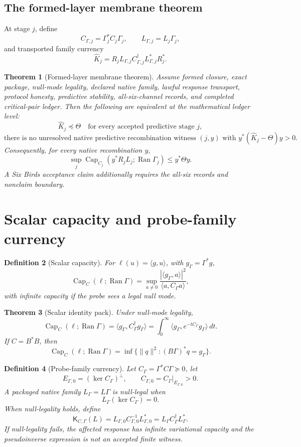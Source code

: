 \documentclass[11pt]{article}
\newtheorem{theorem}{Theorem}[section]
\newtheorem{definition}[theorem]{Definition}
\DeclareMathOperator{\range}{Ran}
\DeclareMathOperator{\Capacity}{Cap}
\newcommand{\K}{\mathsf K}
\newcommand{\Loewner}{\preceq}
\begin{document}
\subsection{The formed-layer membrane theorem}
At stage \(j\), define
\[
  C_{\Gamma,j}=\Gamma_j^*C_j\Gamma_j,
  \qquad
  L_{\Gamma,j}=L_j\Gamma_j,
\]
and transported family currency
\[
  \widehat K_j
  =R_jL_{\Gamma,j}C_{\Gamma,j}^\dagger L_{\Gamma,j}^*R_j^*.
\]

\begin{theorem}[Formed-layer membrane theorem]
Assume formed closure, exact package, null-mode legality, declared native family, lawful response transport, protocol honesty, predictive stability, all-six-channel records, and completed critical-pair ledger.  Then the following are equivalent at the mathematical ledger level:
\[
  \widehat K_j\Loewner\Theta\quad\text{for every accepted predictive stage }j,
\]
\[
  \text{there is no unresolved native predictive recombination witness }(j,y)
  \text{ with }y^*(\widehat K_j-\Theta)y>0.
\]
Consequently, for every native recombination \(y\),
\[
  \sup_j \Capacity_{C_j}(y^*R_jL_j;\range\Gamma_j)\le y^*\Theta y.
\]
A Six Birds acceptance claim additionally requires the all-six records and nonclaim boundary.
\end{theorem}

\section{Scalar capacity and probe-family currency}

\begin{definition}[Scalar capacity]
For \(\ell(u)=\langle g,u\rangle\), with \(g_\Gamma=\Gamma^*g\),
\[
  \Capacity_C(\ell;\range\Gamma)=
  \sup_{a\ne0}\frac{|\langle g_\Gamma,a\rangle|^2}{\langle a,C_\Gamma a\rangle},
\]
with infinite capacity if the probe sees a legal null mode.
\end{definition}

\begin{theorem}[Scalar identity pack]
Under null-mode legality,
\[
  \Capacity_C(\ell;\range\Gamma)=\langle g_\Gamma,C_\Gamma^\dagger g_\Gamma\rangle
  =\int_0^\infty\langle g_\Gamma,e^{-tC_\Gamma}g_\Gamma\rangle\,dt.
\]
If \(C=B^*B\), then
\[
  \Capacity_C(\ell;\range\Gamma)=\inf\{\|q\|^2:(B\Gamma)^*q=g_\Gamma\}.
\]
\end{theorem}

\begin{definition}[Probe-family currency]
Let \(C_\Gamma=\Gamma^*C\Gamma\succeq0\), let
\[
  E_{\Gamma,0}=(\ker C_\Gamma)^\perp,
  \qquad
  C_{\Gamma,0}=C_\Gamma|_{E_{\Gamma,0}}>0.
\]
A packaged native family \(L_\Gamma=L\Gamma\) is null-legal when
\[
  L_\Gamma(\ker C_\Gamma)=0.
\]
When null-legality holds, define
\[
  \K_{C,\Gamma}(L)
  =L_{\Gamma,0}C_{\Gamma,0}^{-1}L_{\Gamma,0}^*
  =L_\Gamma C_\Gamma^\dagger L_\Gamma^*.
\]
If null-legality fails, the affected response has infinite variational capacity and the pseudoinverse expression is not an accepted finite witness.
\end{definition}
\end{document}
